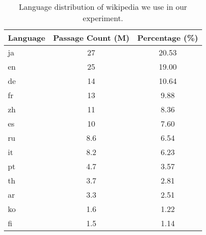 \begin{table}[ht]
\centering
\small
\renewcommand{\arraystretch}{1.2}
\setlength{\tabcolsep}{8pt}
\begin{tabular}{lcc}
\toprule
\textbf{Language} & \textbf{Passage Count (M)} & \textbf{Percentage (\%)} \\
\midrule
ja & 27   & 20.53 \\
en & 25   & 19.00 \\
de & 14   & 10.64 \\
fr & 13   & 9.88  \\
zh & 11   & 8.36  \\
es & 10   & 7.60  \\
ru & 8.6  & 6.54  \\
it & 8.2  & 6.23  \\
pt & 4.7  & 3.57  \\
th & 3.7  & 2.81  \\
ar & 3.3  & 2.51  \\
ko & 1.6  & 1.22  \\
fi & 1.5  & 1.14  \\
\bottomrule
\end{tabular}
\caption{Language distribution of wikipedia we use in our experiment.}
\label{tab:wiki_ratio}
\end{table}